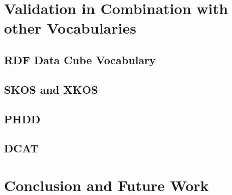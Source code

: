 \documentclass{llncs}
\begin{document}
\section{Validation in Combination with other Vocabularies}

\subsection{RDF Data Cube Vocabulary}

\subsection{SKOS and XKOS}

\subsection{PHDD}

\subsection{DCAT}

\section{Conclusion and Future Work}

{}

\setcounter{tocdepth}{1}
\end{document}
